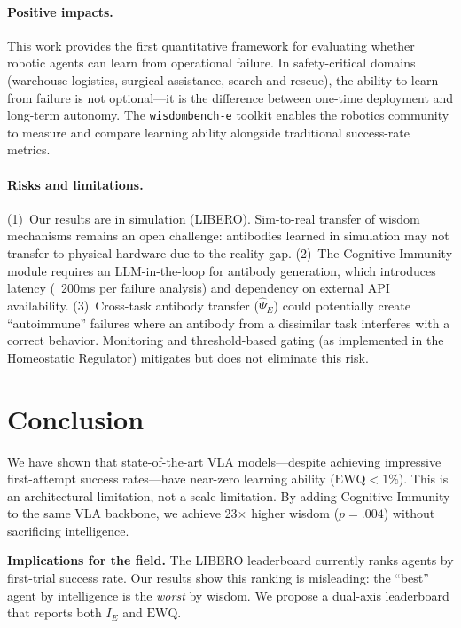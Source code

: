 ﻿\documentclass{article}
\newcommand{\EWQ}{\mathrm{EWQ}}
\begin{document}
\paragraph{Positive impacts.}
This work provides the first quantitative framework for evaluating
whether robotic agents can learn from operational failure.
In safety-critical domains (warehouse logistics, surgical assistance,
search-and-rescue), the ability to learn from failure is not optional---it
is the difference between one-time deployment and long-term autonomy.
The \texttt{wisdombench-e} toolkit enables the robotics community to
measure and compare learning ability alongside traditional success-rate
metrics.

\paragraph{Risks and limitations.}
(1)~Our results are in simulation (LIBERO). Sim-to-real transfer of
wisdom mechanisms remains an open challenge: antibodies learned in
simulation may not transfer to physical hardware due to the reality gap.
(2)~The Cognitive Immunity module requires an LLM-in-the-loop for
antibody generation, which introduces latency (~200ms per failure
analysis) and dependency on external API availability.
(3)~Cross-task antibody transfer ($\hat{\Psi}_E$) could potentially
create ``autoimmune'' failures where an antibody from a dissimilar
task interferes with a correct behavior. Monitoring and threshold-based
gating (as implemented in the Homeostatic Regulator) mitigates but
does not eliminate this risk.

\section{Conclusion}
\label{sec:conclusion}

We have shown that state-of-the-art VLA models---despite achieving impressive first-attempt success rates---have near-zero learning ability ($\EWQ < 1\%$).
This is an architectural limitation, not a scale limitation.
By adding Cognitive Immunity to the same VLA backbone, we achieve 23$\times$ higher wisdom ($p{=}.004$) without sacrificing intelligence.

\textbf{Implications for the field.}
The LIBERO leaderboard currently ranks agents by first-trial success rate.
Our results show this ranking is misleading: the ``best'' agent by intelligence is the \emph{worst} by wisdom.
We propose a dual-axis leaderboard that reports both $I_E$ and $\EWQ$.
\end{document}
